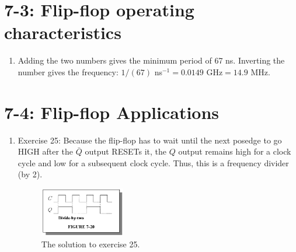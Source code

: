 \documentclass[10pt]{article}
\begin{document}
\section{7-3: Flip-flop operating characteristics}

\begin{enumerate}
\item Adding the two numbers gives the minimum period of 67 ns.  Inverting the number gives the frequency: $1/(67)$ ns$^{-1} = 0.0149$ GHz$ = 14.9$ MHz.
\end{enumerate}

\section{7-4: Flip-flop Applications}

\begin{enumerate}
\item Exercise 25: Because the flip-flop has to wait until the next posedge to go HIGH after the $\bar{Q}$ output RESETs it, the $Q$ output remains high for a clock cycle and low for a subsequent clock cycle.  Thus, this is a frequency divider (by 2).
\begin{figure}[ht]
\centering
\includegraphics[width=0.35\textwidth]{exercise25_ch7.png}
\caption{\label{fig:ex25} The solution to exercise 25.}
\end{figure}
\end{enumerate}
\end{document}
